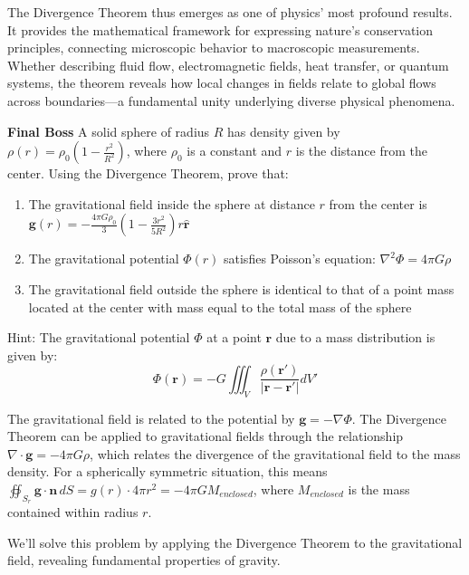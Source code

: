 \noindent The Divergence Theorem thus emerges as one of physics' most profound results. It provides the mathematical framework for expressing nature's conservation principles, connecting microscopic behavior to macroscopic measurements. Whether describing fluid flow, electromagnetic fields, heat transfer, or quantum systems, the theorem reveals how local changes in fields relate to global flows across boundaries—a fundamental unity underlying diverse physical phenomena.


\exampleline
\begin{example}  \textbf{Final Boss}
A solid sphere of radius $R$ has density given by $\rho(r) = \rho_0\left(1 - \frac{r^2}{R^2}\right)$, where $\rho_0$ is a constant and $r$ is the distance from the center. Using the Divergence Theorem, prove that:

\begin{enumerate}
    \item The gravitational field inside the sphere at distance $r$ from the center is $\mathbf{g}(r) = -\frac{4\pi G\rho_0}{3}\left(1 - \frac{3r^2}{5R^2}\right)r\hat{\mathbf{r}}$
    \item The gravitational potential $\Phi(r)$ satisfies Poisson's equation: $\nabla^2\Phi = 4\pi G\rho$
    \item The gravitational field outside the sphere is identical to that of a point mass located at the center with mass equal to the total mass of the sphere
\end{enumerate}

\noindent Hint: The gravitational potential $\Phi$ at a point $\mathbf{r}$ due to a mass distribution is given by:
\[
\Phi(\mathbf{r}) = -G\iiint_V \frac{\rho(\mathbf{r'})}{|\mathbf{r} - \mathbf{r'}|} dV'
\]

\noindent The gravitational field is related to the potential by $\mathbf{g} = -\nabla\Phi$. The Divergence Theorem can be applied to gravitational fields through the relationship $\nabla \cdot \mathbf{g} = -4\pi G\rho$, which relates the divergence of the gravitational field to the mass density. For a spherically symmetric situation, this means $\oiint_{S_r} \mathbf{g} \cdot \mathbf{n} \, dS = g(r) \cdot 4\pi r^2 = -4\pi G M_{enclosed}$, where $M_{enclosed}$ is the mass contained within radius $r$. \\


\begin{solution}
We'll solve this problem by applying the Divergence Theorem to the gravitational field, revealing fundamental properties of gravity.


\end{solution}
\end{example}
